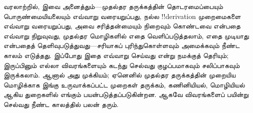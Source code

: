 \documentclass[../../../include/open-logic-section]{subfiles}
\begin{document}
வரலாற்றில், இவை அனைத்தும்---முதல்தர தருக்கத்தின் தொடரமைப்பையும்
பொருண்மையியலையும் எவ்வாறு வரையறுப்பது, நல்ல !!{derivation} முறைமைகளை
எவ்வாறு வரையறுப்பது, அவை சரித்தன்மையும் நிறைவும் கொண்டவை என்பதை எவ்வாறு
நிறுவுவது, முதல்தர மொழிகளில் எதை வெளிப்படுத்தலாம், எதை முடியாது என்பதைத்
தெளிவுபடுத்துவது---சரியாகப் புரிந்துகொள்ளவும் அமைக்கவும் நீண்ட காலம் எடுத்தது.
இப்போது இதை எவ்வாறு செய்வது என்று நமக்குத் தெரியும்; இருப்பினும் எல்லா
விவரங்களையும் கடந்து செல்வது குழப்பமாகவும் சலிப்பாகவும் இருக்கலாம். ஆனால்
அது முக்கியம்; ஏனெனில் முதல்தர தருக்கத்தின் முறையிய மொழிக்காக இங்கு
உருவாக்கப்பட்ட முறைகள் தருக்கம், கணினியியல், மொழியியல் ஆகிய துறைகளில்
எங்கும் பயன்படுத்தப்படுகின்றன. ஆகவே விவரங்களைப் பயின்று செல்வது நீண்ட காலத்தில்
பலன் தரும்.
\end{document}

